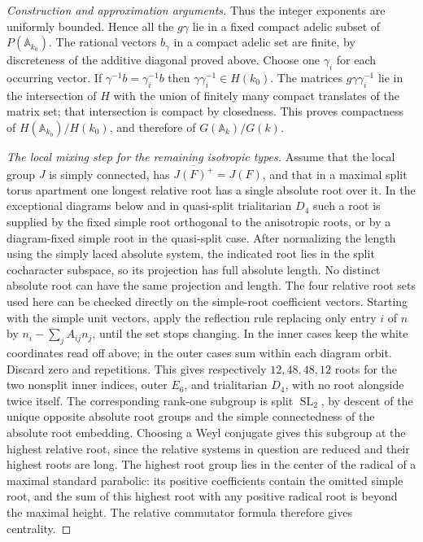\documentclass[11pt,a4paper,openany,oneside]{book}
\theoremstyle{resultstyle}
\theoremstyle{definition}
\numberwithin{equation}{chapter}
\begin{document}
\begin{proof}[Construction and approximation arguments]
Thus the integer exponents are uniformly bounded. Hence all
the \(g\gamma\) lie in a fixed compact adelic subset of
\(P(\mathbb A_{k_0})\). The rational vectors \(b_\gamma\) in a
compact adelic set are finite, by discreteness of the
additive diagonal proved above. Choose one \(\gamma_i\) for
each occurring vector. If \(\gamma^{-1}b=\gamma_i^{-1}b\)
then \(\gamma\gamma_i^{-1}\in H(k_0)\). The matrices
\(g\gamma\gamma_i^{-1}\) lie in the intersection of \(H\)
with the union of finitely many compact translates of the
matrix set; that intersection is compact by closedness.
This proves compactness of \(H(\mathbb A_{k_0})/H(k_0)\), and
therefore of \(G(\mathbb A_k)/G(k)\).

\medskip\noindent
\textit{The local mixing step for the remaining isotropic types.}
Assume that the local group \(J\) is simply connected, has
\(\overline{J(F)^+}=J(F)\), and that in a maximal split torus apartment
one longest relative root has a single absolute root over it.
In the exceptional diagrams below and in quasi-split
trialitarian \(D_4\) such a root is supplied by the fixed
simple root orthogonal to the anisotropic roots, or by a
diagram-fixed simple root in the quasi-split case. After
normalizing the length using the simply laced absolute
system, the indicated root lies in the split cocharacter
subspace, so its projection has full absolute length.
No distinct absolute root can have the same projection and
length. The four relative root sets used here can be checked
directly on the simple-root coefficient vectors. Starting with
the simple unit vectors, apply the reflection rule replacing
only entry \(i\) of \(n\) by \(n_i-\sum_j A_{ij}n_j\), until
the set stops changing. In the inner cases keep the white
coordinates read off above; in the outer cases sum within each
diagram orbit. Discard zero and repetitions. This gives
respectively \(12,48,48,12\) roots for the two nonsplit inner
indices, outer \(E_6\), and trialitarian \(D_4\), with no root
alongside twice itself. The corresponding rank-one subgroup is split
\(\operatorname{SL}_2\), by descent of the unique opposite
absolute root groups and the simple connectedness of the
absolute root embedding. Choosing a Weyl conjugate gives this
subgroup at the highest relative root, since the relative
systems in question are reduced and their highest roots are
long. The highest root group lies in the center of the
radical of a maximal standard parabolic: its positive
coefficients contain the omitted simple root, and the sum of
this highest root with any positive radical root is beyond
the maximal height. The relative commutator formula therefore
gives centrality.


\end{proof}
\end{document}
